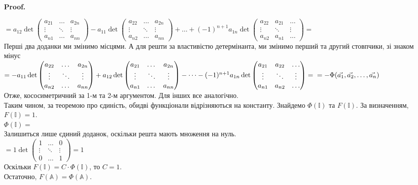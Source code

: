 \documentclass[a4paper, 10pt]{article}
\makeatletter
\def\qed{$\blacksquare$}
\theoremstyle{theoremdd}
\theoremstyle{theoremdd}
\theoremstyle{theoremdd}
\theoremstyle{theoremdd}
\theoremstyle{theoremdd}
\theoremstyle{theoremdd}
\theoremstyle{theoremdd}
\theoremstyle{theoremdd}
\renewenvironment{proof}[1][Proof.\\]{\par
\pushQED{\hfill \qed}%
\normalfont \topsep6\p@\@plus6\p@\relax
\trivlist
\item\relax
{\bfseries
#1\@addpunct{.}}\hspace\labelsep\ignorespaces
}{%
\popQED\endtrivlist\@endpefalse
}
\makeatother
\begin{document}
\begin{proof}
$= a_{12} \det \begin{pmatrix} a_{21} & \dots & a_{2n} \\ \vdots & \ddots & \vdots \\ a_{n1} & \dots & a_{nn} \end{pmatrix} - a_{11} \det \begin{pmatrix} a_{22} & \dots & a_{2n} \\ \vdots & \ddots & \vdots \\ a_{n2} & \dots & a_{nn} \end{pmatrix} + \dots + (-1)^{n+1} a_{1n} \det \begin{pmatrix} a_{22} & a_{21} & \dots \\ \vdots & \ddots & \vdots \\ a_{n2} & a_{n1} & \dots \end{pmatrix} = $\\
Перші два доданки ми змінимо місцями. А для решти за властивістю детермінанта, ми змінимо перший та другий стовпчики, зі знаком мінус\\
$= - a_{11} \det \begin{pmatrix} a_{22} & \dots & a_{2n} \\ \vdots & \ddots & \vdots \\ a_{n2} & \dots & a_{nn} \end{pmatrix} + a_{12} \det \begin{pmatrix} a_{21} & \dots & a_{2n} \\ \vdots & \ddots & \vdots \\ a_{n1} & \dots & a_{nn} \end{pmatrix} - \dots - (-1)^{n+1} a_{1n} \det \begin{pmatrix} a_{21} & a_{22} & \dots \\ \vdots & \ddots & \vdots \\ a_{n1} & a_{n2} & \dots \end{pmatrix} = \\ = -\Phi(\vec{a_1},\vec{a_2},\dots,\vec{a_n})$\\
Отже, кососиметричний за 1-м та 2-м аргументом. Для інших все аналогічно.
\bigskip \\
Таким чином, за теоремою про єдиність, обидві функціонали відрізняються на константу. Знайдемо $\Phi(\mathbb{I})$ та $F(\mathbb{I})$. За визначенням, $F(\mathbb{I}) = 1$.\\
$\Phi(\mathbb{I}) =$\\
Залишиться лише єдиний доданок, оскільки решта мають множення на нуль.\\
$= 1 \det \begin{pmatrix} 1 & \dots & 0 \\ \vdots & \ddots & \vdots \\ 0 & \dots & 1 \end{pmatrix} = 1$\\
Оскільки $F(\mathbb{I}) = C\cdot \Phi(\mathbb{I})$, то $C = 1$.\\
Остаточно, $F(\mathbb{A}) = \Phi(\mathbb{A})$.
\end{proof}
\end{document}
